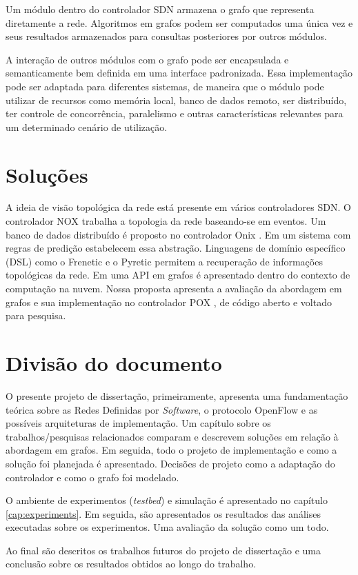 Um módulo dentro do controlador SDN armazena o grafo que representa diretamente
a rede.
Algoritmos em grafos podem ser computados uma única vez e seus resultados 
armazenados para consultas posteriores por outros módulos.

A interação de outros módulos com o grafo pode ser encapsulada e 
semanticamente bem definida em uma interface padronizada.
Essa implementação pode ser adaptada para diferentes sistemas, de maneira que
o módulo pode utilizar de recursos como memória local, banco de dados remoto,
ser distribuído, ter controle de concorrência, paralelismo e outras 
características relevantes para um determinado cenário de utilização.

\section{Soluções}

A ideia de visão topológica da rede está presente em vários controladores SDN.
O controlador NOX \citep{gude2008nox} trabalha a topologia da rede baseando-se
em eventos.
Um banco de dados distribuído é proposto no controlador Onix 
\citep{teemu2010onix}.
Em \citep{hinrichs2009pratical} um sistema com regras de predição 
estabelecem essa abstração.
Linguagens de domínio específico (DSL) como o Frenetic 
\citep{foster2011frenetic} e o Pyretic \citep{monsanto2013composing} permitem
a recuperação de informações topológicas da rede.
Em \citep{ramya2012dynamic} uma API em grafos é apresentado dentro do contexto
de computação na nuvem.
Nossa proposta apresenta a avaliação da abordagem em grafos e sua implementação
no controlador POX \citep{pox2015}, de código aberto e voltado para pesquisa.

\section{Divisão do documento}

O presente projeto de dissertação, primeiramente, apresenta uma fundamentação
teórica sobre as Redes Definidas por \emph{Software}, o protocolo OpenFlow e
as possíveis arquiteturas de implementação.
Um capítulo sobre os trabalhos/pesquisas relacionados comparam e descrevem
soluções em relação à abordagem em grafos.
Em seguida, todo o projeto de implementação e como a solução foi planejada
é apresentado. 
Decisões de projeto como a adaptação do controlador e como o grafo foi 
modelado.

O ambiente de experimentos (\emph{testbed}) e simulação é apresentado no 
capítulo \ref{cap:experiments}.
Em seguida, são apresentados os resultados das análises executadas sobre os
experimentos.
Uma avaliação da solução como um todo.

Ao final são descritos os trabalhos futuros do projeto de dissertação e uma
conclusão sobre os resultados obtidos ao longo do trabalho.
